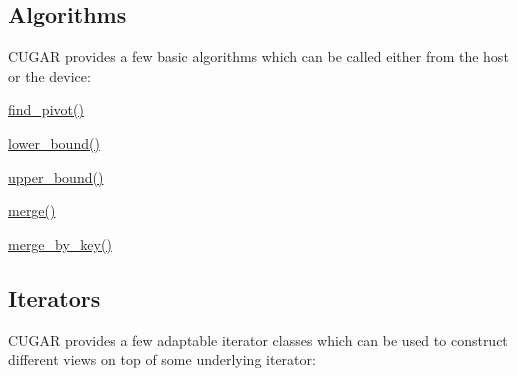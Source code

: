  \hypertarget{algorithms_page}{}\subsection{Algorithms}\label{algorithms_page}
C\+U\+G\+AR provides a few basic algorithms which can be called either from the host or the device\+:


\begin{DoxyItemize}
\item \hyperlink{group___algorithms_module_gaf5c0f35d93fa8af4939155b21c7e2a4f}{find\+\_\+pivot()}
\item \hyperlink{group___algorithms_module_gab5ce2c7f834a31bc40d9101865dec5d1}{lower\+\_\+bound()}
\item \hyperlink{group___algorithms_module_gafe7ee3a93350b3d2f7f7bb6266ee0425}{upper\+\_\+bound()}
\item \hyperlink{group___algorithms_module_gae6ef81c9ca1cd3976caad12299e37452}{merge()}
\item \hyperlink{group___algorithms_module_ga267a2752f3e81f521e759ec274b80561}{merge\+\_\+by\+\_\+key()} 
\end{DoxyItemize}\hypertarget{iterators_page}{}\subsection{Iterators}\label{iterators_page}
C\+U\+G\+AR provides a few adaptable iterator classes which can be used to construct different views on top of some underlying iterator\+:


